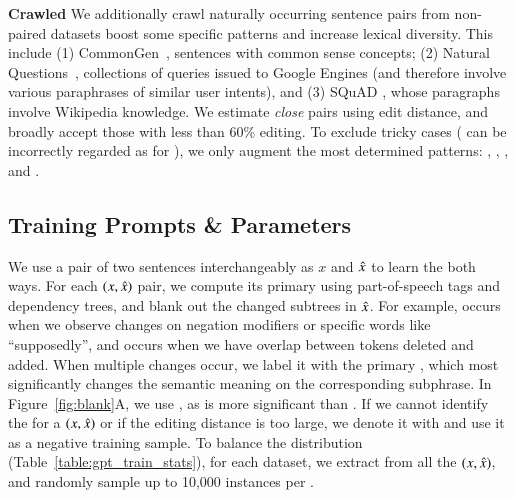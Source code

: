 \textbf{Crawled} 
We additionally crawl naturally occurring sentence pairs from non-paired datasets boost some specific patterns and increase lexical diversity. 
This include 
(1) CommonGen~\cite{lin-etal-2020-commongen}, sentences with common sense concepts; 
(2) Natural Questions~\cite{kwiatkowski-etal-2019-natural}, collections of queries issued to Google Engines (and therefore involve various paraphrases of similar user intents), and 
(3) SQuAD \cite{rajpurkar-etal-2016-squad}, whose paragraphs involve Wikipedia knowledge.
We estimate \emph{close} pairs using edit distance, and broadly accept those with less than 60\% editing.
To exclude tricky cases (\eg {} can be incorrectly regarded as  for ), we only augment the most determined patterns: , , , and .


\subsection{Training Prompts \& Parameters}

We use a pair of two sentences interchangeably as $x$ and $\hat{x}$ to learn the \tagstrs both ways.
For each $(x, \hat{x})$ pair, we compute its primary \tagstr using part-of-speech tags and dependency trees, and blank out the changed subtrees in $\hat{x}$.
For example,  occurs when we observe changes on negation modifiers or specific words like ``supposedly'', and  occurs when we have overlap between tokens deleted and added.
When multiple changes occur, we label it with the primary \tagstr, which most significantly changes the semantic meaning on the corresponding subphrase.
In Figure~\ref{fig:blank}A, we use , as  is more significant than .
If we cannot identify the \tagstr for a $(x, \hat{x})$ or if the editing distance is too large, we denote it with  and use it as a negative training sample.
To balance the distribution (Table~\ref{table:gpt_train_stats}), for each dataset, we extract \tagstrs from all the $(x, \hat{x})$, and randomly sample up to 10,000 instances per \tagstrshorts.

